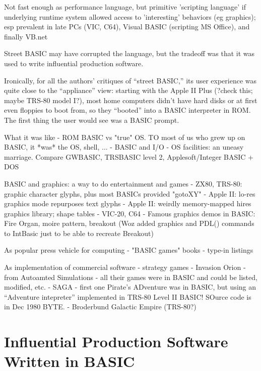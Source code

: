 \documentclass{article}
\begin{document}
Not fast enough as performance language, but primitive 'scripting
language' if underlying runtime system allowed access to 'interesting'
behaviors (eg graphics); esp prevalent in late PCs (VIC, C64), Visual
BASIC (scripting MS Office), and finally VB.net

Street BASIC may have corrupted the language, but the tradeoff was that
it was used to write influential production software.

Ironically, for all the authors' critiques of ``street BASIC,'' its user
experience was quite close to the ``appliance'' view: starting with the
Apple II Plus (?check this; maybe TRS-80 model I?), most home computers
didn't have hard disks or at first even floppies to boot from, so they
``booted'' into a BASIC interpreter in ROM.  The first thing the user
would see was a BASIC prompt. 


What it was like
  - ROM BASIC vs "true" OS.  TO most of us who grew up on BASIC, it
  *was* the OS, shell, ...
  - BASIC and I/O - OS facilities: an uneasy marriage.  Compare GWBASIC,
  TRSBASIC level 2, Applesoft/Integer BASIC + DOS

BASIC and graphics: a way to do entertainment and games
  - ZX80, TRS-80: graphic character glyphs, plus most BASICs provided "gotoXY"
  - Apple II: lo-res graphics mode repurposes text glyphs
  - Apple II: weirdly memory-mapped hires graphics library; shape tables
  - VIC-20, C64
  - Famous graphics demos in BASIC: Fire Organ, moire pattern, breakout
  (Woz added graphics and PDL() commands to IntBasic just to be able to
  recreate Breakout)

As popular press vehicle for computing
  - "BASIC games" books
  - type-in listings

As implementation of commercial software - strategy games
  - Invasion Orion - from Autoamted Simulations - all their games were
  in BASIC and could be listed, modified, etc.
  - SAGA - first one Pirate's ADventure was in BASIC, but using an
  ``Adventure intepreter'' implemented in TRS-80 Level II BASIC!  SOurce
  code is in Dec 1980 BYTE.
  - Broderbund Galactic Empire (TRS-80?)



\section{Influential Production Software Written in BASIC}

\end{document}
